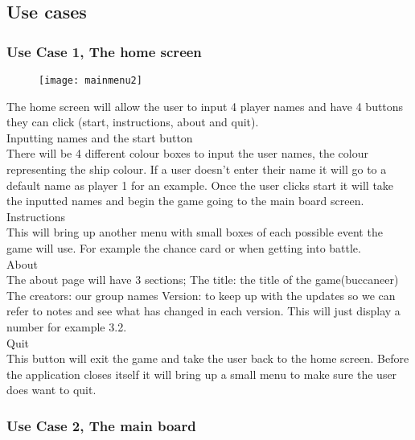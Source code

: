 \documentclass{article}
\begin{document}
	\subsection{Use cases}
	\subsubsection{Use Case 1, The home screen}
		\begin{figure}[H]
		\centering
		\texttt{[image: mainmenu2]}
		\label{fig:mainmenu}
		\end{figure}
	The home screen will allow the user to input 4 player names and have 4 buttons they can click (start, instructions, about and quit).\\

Inputting names and the start button\\
There will be 4 different colour boxes to input the user names, the colour representing the ship colour. If a user doesn’t enter their name it will go to a default name as player 1 for an example. Once the user clicks start it will take the inputted names and begin the game going to the main board screen.\\

Instructions\\
This will bring up another menu with small boxes of each possible event the game will use. For example the chance card or when getting into battle.\\

About\\
The about page will have 3 sections;
The title: the title of the game(buccaneer)
The creators: our group names
Version: to keep up with the updates so we can refer to notes and see what has changed in each version. This will just display a number for example 3.2.\\

Quit\\
This button will exit the game and take the user back to the home screen. Before the application closes itself it will bring up a small menu to make sure the user does want to quit.\\

	\subsubsection{Use Case 2, The main board}
	
\end{document}
